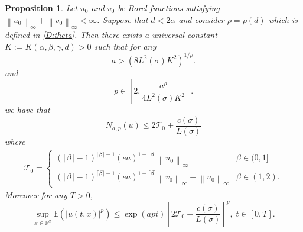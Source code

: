 \documentclass[a4paper,11pt]{article}
\numberwithin{equation}{section}
\theoremstyle{plain}
\newtheorem{proposition}[theorem]{Proposition}
\theoremstyle{definition}
\newcommand{\Norm}[1]{\left\|  #1   \right\|}
\newcommand{\R}{\mathbb{R}}
\numberwithin{NQ}{section}
\numberwithin{LQ}{section}
\numberwithin{ZQ}{section}
\begin{document}
	\begin{proposition}{\normalfont\cite[Proposition 3.2]{SoleMillet2021}}
		\label{P:N(u)Bdd}
		Let $u_0$ and $v_0$ be Borel functions satisfying $\Norm{u_0}_\infty + \Norm{v_0}_\infty < \infty$. Suppose that $d < 2 \alpha$ and consider $\rho = \rho(d)$ which is defined in \eqref{D:theta}. Then there exists a universal constant $K:=K(\alpha, \beta, \gamma,d) >0$ such that for any 
		\[
		a > \left( 8 L^2(\sigma)K^2\right)^{1/\rho}.
		\]
		and 
		\[
		p \in \left[ 2, \frac{a^{\rho}}{4L^2(\sigma)K^2} \right].
		\]
		we have that 
		\begin{equation}
		\label{E:Nbdd}
		N_{a,p}(u)  \le 2 \mathcal{T}_0 +  \frac{c(\sigma)}{L(\sigma)}
		\end{equation}	
		where
		\begin{align*}
		\mathcal{T}_0 = \begin{cases} 
		(\lceil \beta \rceil - 1)^{\lceil \beta \rceil -1}(ea)^{1-\lceil \beta \rceil} \Norm{u_0}_\infty  & \beta \in (0,1]
		\\ (\lceil \beta \rceil - 1)^{\lceil \beta \rceil -1}(ea)^{1-\lceil \beta \rceil} \Norm{v_0}_\infty + \Norm{u_0}_\infty & \beta \in (1,2).
		\end{cases} 
		\end{align*}
		Moreover for any $T>0$,
		\begin{equation}
		\label{E:Pnormtbdd}
		\sup_{x\in\R^d} \mathbb{E}(|u(t,x)|^p) \le \exp\left( a p t  \right) \left[ 2 \mathcal{T}_0 + \frac{ c(\sigma) }{L(\sigma)} \right]^p, \; t\in[0,T].
		\end{equation}
	\end{proposition}
\end{document}
